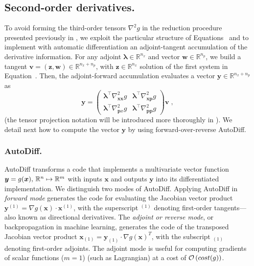 \subsection{Second-order derivatives.}
\label{sec:reduction:ad}
To avoid forming the third-order tensors $\nabla^2 g$  in the reduction procedure
presented previously in , we exploit
the particular structure of Equations~
and  to implement with automatic differentiation
an adjoint-tangent accumulation of the derivative information.
For any adjoint $\bm{\lambda} \in \mathbb{R}^{n_x}$ and vector $\bm{w} \in \mathbb{R}^{n_p}$, we build a tangent
$\bm{v} = (\bm{z}, \bm{w}) \in \mathbb{R}^{n_x + n_p}$, with $\bm{z} \in \mathbb{R}^{n_x}$
solution of the first system in Equation~.
Then, the adjoint-forward accumulation evaluates a vector $\bm{y} \in \mathbb{R}^{n_x + n_p}$
as
\begin{equation}
  \label{eq:ADreduction}
  \bm{y} =  \begin{pmatrix}
   \bm{\lambda}^\top\nabla^2_{\bm{x}\bm{x}} g & \bm{\lambda}^\top\nabla^2_{\bm{x}\bm{p}} g \\
   \bm{\lambda}^\top\nabla^2_{\bm{p}{x}} g & \bm{\lambda}^\top\nabla^2_{\bm{p}\bm{p}} g
  \end{pmatrix}
  \bm{v} \; ,
\end{equation}
(the tensor projection notation will be introduced more thoroughly
in ).
We detail next how to compute the vector $\bm{y}$ by
using forward-over-reverse AutoDiff.

\subsubsection{AutoDiff.}
\label{sec:autodiff}
AutoDiff transforms a code that implements a multivariate vector function $\bm{y} = g(\bm{x}),\, \mathbb{R}^n \mapsto \mathbb{R}^m$ with inputs $\bm{x}$ and outputs $\bm{y}$ into its differentiated implementation. We distinguish  two modes of AutoDiff. Applying AutoDiff in {\it forward mode} generates the code for evaluating the Jacobian vector product $\bm{y}^{(1)} = \nabla g(\bm{x}) \cdot \bm{x}^{(1)}$, with the superscript $^{(1)}$ denoting first-order
tangents---also known as directional derivatives.  The {\it adjoint or reverse mode}, or backpropagation in machine learning, generates the code of the transposed Jacobian vector product $\bm{x}_{(1)} = \bm{y}_{(1)}\cdot \nabla g(\bm{x})^T$, with the subscript $_{(1)}$ denoting first-order adjoints. The adjoint mode is useful for computing gradients of scalar functions ($m=1$) (such as Lagrangian) at a cost of $\mathcal{O}\left( cost(g) \right)$.

